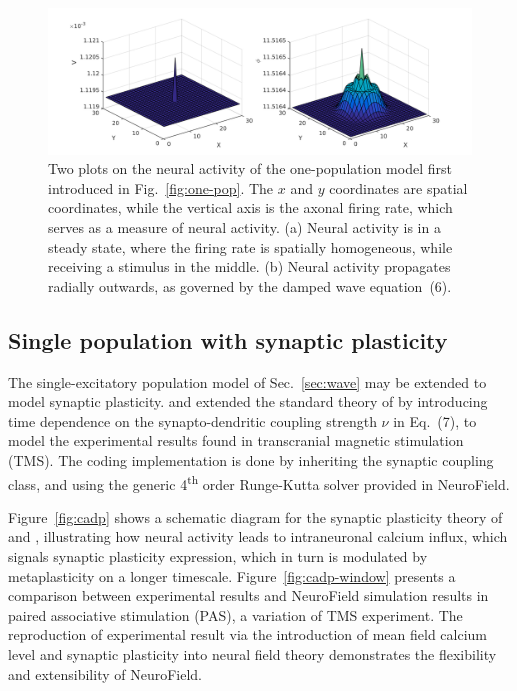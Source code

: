 \documentclass[preprint,review,10pt,authoryear,letterpaper]{elsarticle}
\begin{document}

\begin{figure}[t]
\begin{center}
\includegraphics[width=.9\textwidth]{wave_comparison}
\caption{Two plots on the neural activity of the one-population model first introduced in Fig.~\ref{fig:one-pop}. The \(x\) and \(y\) coordinates are spatial coordinates, while the vertical axis is the axonal firing rate, which serves as a measure of neural activity. (a) Neural activity is in a steady state, where the firing rate is spatially homogeneous, while receiving a stimulus in the middle. (b) Neural activity propagates radially outwards, as governed by the damped wave equation~(6).}
\label{fig:wave_comparison}
\end{center}
\end{figure}


\subsection{Single population with synaptic plasticity}
\label{sec:cadp}

The single-excitatory population model of Sec.~\ref{sec:wave} may be extended to model synaptic plasticity. \citet{fung13} and \citet{fung14} extended the standard theory of \citet{Robinson2005} by introducing time dependence on the synapto-dendritic coupling strength \(\nu\) in Eq.~(7), to model the experimental results found in transcranial magnetic stimulation (TMS). The coding implementation is done by inheriting the synaptic coupling class, and using the generic 4\textsuperscript{th} order Runge-Kutta solver provided in NeuroField.

Figure~\ref{fig:cadp} shows a schematic diagram for the synaptic plasticity theory of \citet{fung13} and \citet{fung14}, illustrating how neural activity leads to intraneuronal calcium influx, which signals synaptic plasticity expression, which in turn is modulated by metaplasticity on a longer timescale. Figure~\ref{fig:cadp-window} presents a comparison between experimental results and NeuroField simulation results in paired associative stimulation (PAS), a variation of TMS experiment. The reproduction of experimental result via the introduction of mean field calcium level and synaptic plasticity into neural field theory demonstrates the flexibility and extensibility of NeuroField.
\end{document}
